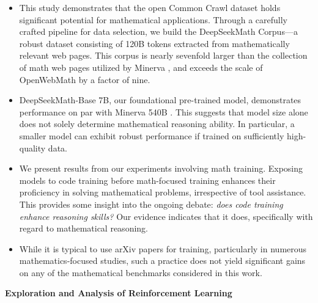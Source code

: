 \begin{itemize}[topsep=0pt]
    \item This study demonstrates that the open Common Crawl dataset holds significant potential for mathematical applications. Through a carefully crafted pipeline for data selection, we build the DeepSeekMath Corpus—a robust dataset consisting of 120B tokens extracted from mathematically relevant web pages. This corpus is nearly sevenfold larger than the collection of math web pages utilized by Minerva \citep{minerva}, and exceeds the scale of OpenWebMath \citep{openwebmath} by a factor of nine.

\item DeepSeekMath-Base 7B, our foundational pre-trained model, demonstrates performance on par with Minerva 540B \citep{minerva}. This suggests that model size alone does not solely determine mathematical reasoning ability. In particular, a smaller model can exhibit robust performance if trained on sufficiently high-quality data.

\item We present results from our experiments involving math training. Exposing models to code training before math-focused training enhances their proficiency in solving mathematical problems, irrespective of tool assistance. This provides some insight into the ongoing debate: \textit{does code training enhance reasoning skills?} Our evidence indicates that it does, specifically with regard to mathematical reasoning.

\item While it is typical to use arXiv papers for training, particularly in numerous mathematics-focused studies, such a practice does not yield significant gains on any of the mathematical benchmarks considered in this work.
\end{itemize}

\textbf{Exploration and Analysis of Reinforcement Learning}

